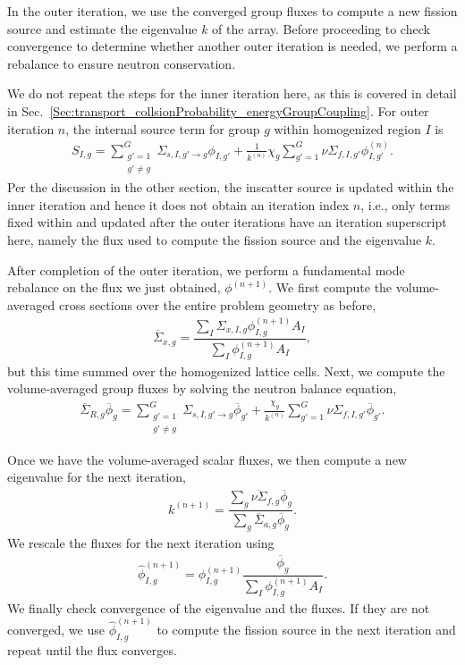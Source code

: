 In the outer iteration, we use the converged group fluxes to compute a new fission source and estimate the eigenvalue $k$ of the array. Before proceeding to check convergence to determine whether another outer iteration is needed, we perform a rebalance to ensure neutron conservation.

We do not repeat the steps for the inner iteration here, as this is covered in detail in Sec.~\ref{Sec:transport_collsionProbability_energyGroupCoupling}. For outer iteration $n$, the internal source term for group $g$ within homogenized region $I$ is 
\begin{align}
  S_{I,g} = 
  \sum_{\substack{g' = 1\\ g' \ne g}}^G \Sigma_{s,I,g' \rightarrow g} \phi_{I,g'} 
  + \frac{1}{k^{(n)}} \chi_{g} \sum_{g'=1}^G \nu\Sigma_{f,I,g'} \phi_{I,g'}^{(n)} .
\end{align}
Per the discussion in the other section, the inscatter source is updated within the inner iteration and hence it does not obtain an iteration index $n$, i.e., only terms fixed within and updated after the outer iterations have an iteration superscript here, namely the flux used to compute the fission source and the eigenvalue $k$.

After completion of the outer iteration, we perform a fundamental mode rebalance on the flux we just obtained, $\phi^{(n+1)}$. We first compute the volume-averaged cross sections over the entire problem geometry as before,
\begin{align}
  \overline{\Sigma}_{x,g} = \dfrac{ \displaystyle\sum_I \Sigma_{x,I,g} \phi_{I,g}^{(n+1)} A_I }{ \displaystyle\sum_I \phi_{I,g}^{(n+1)} A_I } ,
\end{align}
but this time summed over the homogenized lattice cells. Next, we compute the volume-averaged group fluxes by solving the neutron balance equation,
\begin{align}
  \overline{\Sigma}_{R,g} \overline{\phi}_g = \sum_{\substack{g' = 1\\ g' \ne g}}^G \Sigma_{s,I,g' \rightarrow g} \overline{\phi}_{g'}  
  + \frac{\chi_{g}}{k^{(n)}}  \sum_{g'=1}^G \nu\Sigma_{f,I,g'} \overline{\phi}_{g'} .
\end{align}

Once we have the volume-averaged scalar fluxes, we then compute a new eigenvalue for the next iteration,
\begin{align}
  k^{(n+1)} =  \dfrac{ \displaystyle\sum_g \overline{ \nu \Sigma }_{f,g} \overline{\phi}_g }{ \displaystyle\sum_g \overline{ \Sigma }_{a,g} \overline{\phi}_g } .
\end{align}
We rescale the fluxes for the next iteration using
\begin{align}
  \hat{\phi}_{I,g}^{(n+1)} = \phi_{I,g}^{(n+1)} \dfrac{ \overline{\phi}_g }{ \displaystyle\sum_I \phi_{I,g}^{(n+1)} A_I } .
\end{align}
We finally check convergence of the eigenvalue and the fluxes. If they are not converged, we use $\hat{\phi}_{I,g}^{(n+1)}$ to compute the fission source in the next iteration and repeat until the flux converges.




